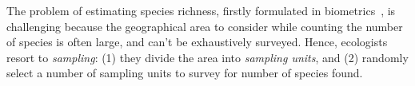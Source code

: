 \documentclass[sigconf,review,anonymous]{acmart}
\begin{document}
%


%
%

The problem of estimating species richness, firstly formulated in
biometrics~\cite{chao2016species}, is challenging because the geographical area
to consider while counting the number of species is often large, 
and can't be exhaustively surveyed.
%
Hence, ecologists resort to \emph{sampling}:
(1) they divide the area into \emph{sampling units}, and %
%
(2) randomly select a number of sampling units to survey for number of species found.
\end{document}
